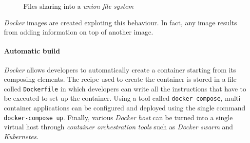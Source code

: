 \begin{figure}[h!]
    \centering
    \captionsetup[subfloat]{singlelinecheck=false, width=40mm,
    justification=raggedright}
    \hspace{1.5cm}
    \hspace{1.5cm}
    \caption{Files sharing into a \emph{union file system}}
\end{figure}

\noindent
\emph{Docker} images are created exploting this behaviour. In fact, any
image results from adding information on top of another image.

\paragraph{Automatic build}
\emph{Docker} allows developers to automatically create a container starting from
its composing elements. The recipe used to create the container is stored in a
file colled \texttt{Dockerfile} in which developers can write all the
instructions that have to be executed to set up the container. Using a tool
called \texttt{docker-compose}, multi-container applications can be configured
and deployed using the single command \texttt{docker-compose up}. Finally,
various \emph{Docker host} can be turned into a single virtual host through
\emph{container orchestration tools} such as \emph{Docker swarm} and
\emph{Kubernetes}.